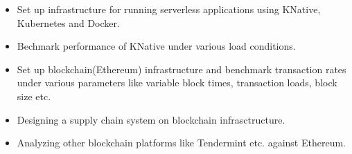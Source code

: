 \documentclass[10pt,a4paper,ragged2e]{altacv}
\begin{document}
\tagline{}

\begin{fullwidth}
\makecvheader
\end{fullwidth}



\begin{itemize}
\item Set up infrastructure for running serverless applications using KNative, Kubernetes and Docker.
\item Bechmark performance of KNative under various load conditions.
\end{itemize}

\divider

\begin{itemize}
\item Set up blockchain(Ethereum) infrastructure and benchmark transaction rates under various parameters like variable block times, transaction loads, block size etc.
\item Designing a supply chain system on blockchain infrasctructure.
\item Analyzing other blockchain platforms like Tendermint etc. against Ethereum.
\end{itemize}
\end{document}
